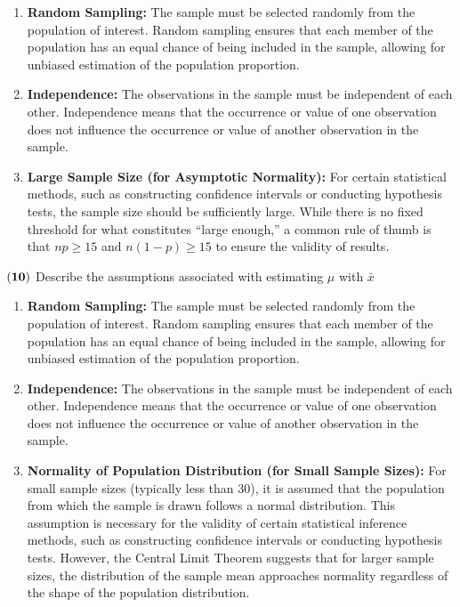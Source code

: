 \documentclass[
]{article}
\begin{document}
\begin{enumerate}
\def\labelenumi{\arabic{enumi}.}
\item
  { \textbf{Random Sampling:} The sample must be selected randomly from
  the population of interest. Random sampling ensures that each member
  of the population has an equal chance of being included in the sample,
  allowing for unbiased estimation of the population proportion.}
\item
  { \textbf{Independence:} The observations in the sample must be
  independent of each other. Independence means that the occurrence or
  value of one observation does not influence the occurrence or value of
  another observation in the sample.}
\item
  { \textbf{Large Sample Size (for Asymptotic Normality):} For certain
  statistical methods, such as constructing confidence intervals or
  conducting hypothesis tests, the sample size should be sufficiently
  large. While there is no fixed threshold for what constitutes ``large
  enough,'' a common rule of thumb is that \(np\geq 15\) and
  \(n(1-p)\geq 15\) to ensure the validity of results. }
\end{enumerate}

\(\bf (10)\) Describe the assumptions associated with estimating \(\mu\)
with \(\bar{x}\)

\begin{enumerate}
\def\labelenumi{\arabic{enumi}.}
\item
  { \textbf{Random Sampling:} The sample must be selected randomly from
  the population of interest. Random sampling ensures that each member
  of the population has an equal chance of being included in the sample,
  allowing for unbiased estimation of the population proportion. }
\item
  { \textbf{Independence:} The observations in the sample must be
  independent of each other. Independence means that the occurrence or
  value of one observation does not influence the occurrence or value of
  another observation in the sample. }
\item
  { \textbf{Normality of Population Distribution (for Small Sample
  Sizes):} For small sample sizes (typically less than 30), it is
  assumed that the population from which the sample is drawn follows a
  normal distribution. This assumption is necessary for the validity of
  certain statistical inference methods, such as constructing confidence
  intervals or conducting hypothesis tests. However, the Central Limit
  Theorem suggests that for larger sample sizes, the distribution of the
  sample mean approaches normality regardless of the shape of the
  population distribution. }
\end{enumerate}
\end{document}
